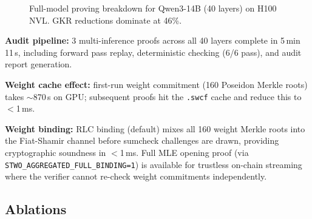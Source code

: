 \documentclass[10pt,twocolumn]{article}
\theoremstyle{definition}
\theoremstyle{remark}
\begin{document}
\begin{figure}[t]
  \centering
  \caption{Full-model proving breakdown for Qwen3-14B (40 layers)
           on H100 NVL. GKR reductions dominate at 46\%.}
  \label{fig:proving-breakdown}
\end{figure}

\textbf{Audit pipeline:} 3 multi-inference proofs across all
40 layers complete in 5\,min\,11\,s, including forward pass replay,
deterministic checking (6/6 pass), and audit report generation.

\textbf{Weight cache effect:} first-run weight commitment
(160 Poseidon Merkle roots) takes $\sim$870\,s on GPU;
subsequent proofs hit the \texttt{.swcf} cache
and reduce this to $<$1\,ms.

\textbf{Weight binding:} RLC binding (default) mixes all 160 weight
Merkle roots into the Fiat-Shamir channel before sumcheck challenges
are drawn, providing cryptographic soundness in $<$1\,ms.
Full MLE opening proof (via \texttt{STWO\_AGGREGATED\_FULL\_BINDING=1})
is available for trustless on-chain streaming where the verifier
cannot re-check weight commitments independently.

\subsection{Ablations}
\end{document}
